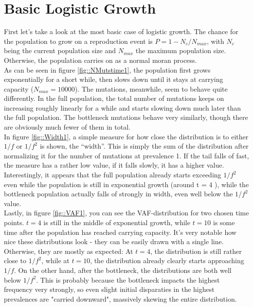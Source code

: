 \documentclass{article}
\numberwithin{equation}{subsection}
\begin{document}
	
	\section{Basic Logistic Growth}
	First let's take a look at the most basic case of logistic growth. The chance for the population to grow on a reproduction event is $P = 1-N_c/N_{max}$, with $N_c$ being the current population size and $N_{max}$ the maximum population size. Otherwise, the population carries on as a normal moran process.\\
	As can be seen in figure \ref{fig::NMutstime1}, the population first grows exponentially for a short while, then slows down until it stays at carrying capacity ($N_{max} = 10000$). The mutations, meanwhile, seem to behave quite differently. In the full population, the total number of mutations keeps on increasing roughly linearly for a while and starts slowing down much later than the full population. The bottleneck mutations behave very similarly, though there are obviously much fewer of them in total.\\
	In figure \ref{fig::Width1}, a simple measure for how close the distribution is to either $1/f$ or $ 1/f^2$ is shown, the ``width''. This is simply the sum of the distribution after normalizing it for the number of mutations at prevalence 1. If the tail falls of fast, the measure has a rather low value, if it falls slowly, it has a higher value. Interestingly, it appears that the full population already starts exceeding $ 1/f^2 $ even while the population is still in exponential growth (around t = 4 ), while the bottleneck population actually falls of strongly in width, even well below the $ 1/f^2 $ value.\\
	Lastly, in figure \ref{fig::VAF1}, you can see the VAF-distribution for two chosen time points. $ t = 4 $ is still in the middle of exponential growth, while $ t = 10 $ is some time after the population has reached carrying capacity. It's very notable how nice these distributions look - they can be easily drawn with a single line. Otherwise, they are mostly as expected: At $ t = 4 $, the distribution is still rather close to $ 1/f^2 $, while at $ t = 10$, the distribution already clearly starts approaching $ 1/f $. On the other hand, after the bottleneck, the distributions are both well below $1/f^2$. This is probably because the bottleneck impacts the highest frequency very strongly, so even slight initial disparaties in the highest prevalences are "carried downward", massively skewing the entire distribution.\\
\end{document}
